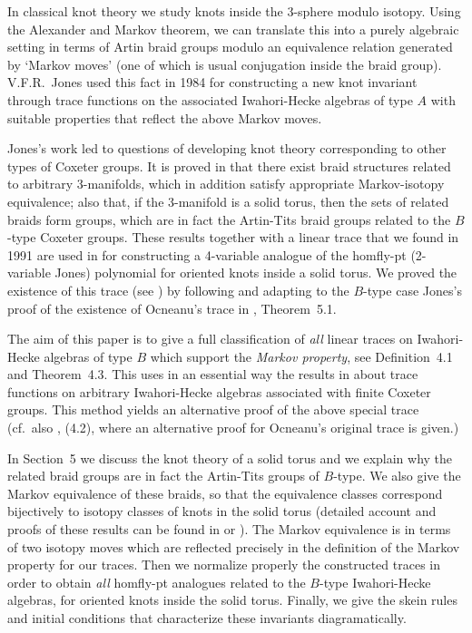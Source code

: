 In  classical knot theory we  study knots inside the $3$-sphere modulo
isotopy.   Using the Alexander and Markov  theorem,  we can translate
this into a purely  algebraic setting in terms  of Artin  braid groups
modulo an equivalence  relation generated  by  `Markov moves'  (one of
which   is usual  conjugation  inside  the   braid
group).    V.F.R.\  Jones \cite{Jones} used  this    fact  in 1984 for
constructing   a new knot   invariant  through trace functions  on the
associated Iwahori-Hecke  algebras of type  $A$  with suitable 
properties that reflect  the  above  Markov moves.  

Jones's work led to  questions of developing knot theory corresponding
to other types of Coxeter groups. It is proved
in \cite{L1}  that there exist braid   structures related to arbitrary
3-manifolds, which   in  addition  satisfy  appropriate Markov-isotopy
equivalence; also that, if the 3-manifold is a solid torus,
then  the sets of  related braids form groups, which   are in fact the
Artin-Tits braid groups related  to the $B$-type Coxeter groups. These
results together with a linear  trace that we  found in 1991 are
used  in  \cite{L2} for constructing    a  4-variable analogue of  the
homfly-pt (2-variable Jones)   polynomial for oriented knots  inside a
solid torus.  We proved the existence of this trace (see \cite{L2}) by
following and adapting   to the $B$-type  case  Jones's proof of   the
existence of Ocneanu's trace in \cite{Jones}, Theorem~5.1.

\bigbreak
The aim of this  paper is to give a  full classification of  {\it all}
linear traces on Iwahori-Hecke algebras  of type $B$ which support the
{\it Markov property}, see  Definition~4.1 and Theorem~4.3.  This uses
in an essential way the results in  \cite{GP} about trace functions on
arbitrary  Iwahori-Hecke  algebras associated  with   finite   Coxeter
groups.  This method yields an  alternative proof of  the above
special trace (cf.\ also  \cite{GP}, (4.2), where an alternative proof
for Ocneanu's original trace is given.) 

In Section~5 we  discuss  the knot  theory of a   solid torus  and  we
explain why the related braid groups are in fact the Artin-Tits groups
of $B$-type.  We also give the  Markov equivalence of these braids, so
that the equivalence classes correspond bijectively to isotopy classes
of knots  in  the solid torus (detailed  account  and proofs of  these
results     can be  found  in   \cite{L1}  or  \cite{L2}). The  Markov
equivalence is in   terms of two   isotopy moves  which are  reflected
precisely in  the definition of the  Markov  property for  our traces.
Then we normalize  properly the constructed traces  in order to obtain
{\it all} homfly-pt analogues   related to the  $B$-type Iwahori-Hecke
algebras,    for    oriented    knots  inside  the   solid
torus.  Finally, we give the  skein rules  and initial conditions that
characterize these invariants diagramatically.


